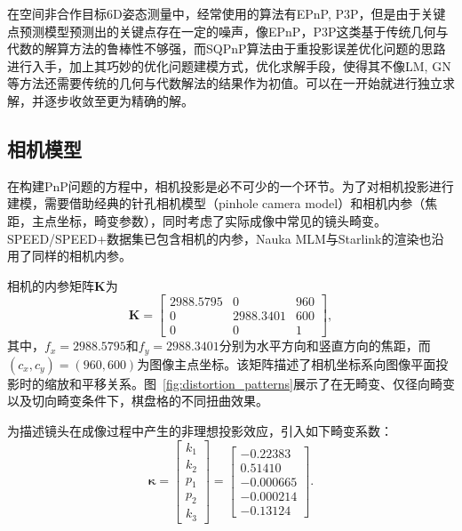 在空间非合作目标6D姿态测量中，经常使用的算法有EPnP, P3P，但是由于关键点预测模型预测出的关键点存在一定的噪声，像EPnP，P3P这类基于传统几何与代数的解算方法的鲁棒性不够强，而SQPnP算法\cite{terzakis2020consistently}由于重投影误差优化问题的思路进行入手，加上其巧妙的优化问题建模方式，优化求解手段，使得其不像LM, GN等方法还需要传统的几何与代数解法的结果作为初值。可以在一开始就进行独立求解，并逐步收敛至更为精确的解。
\subsection{相机模型}
在构建PnP问题的方程中，相机投影是必不可少的一个环节。为了对相机投影进行建模，需要借助经典的针孔相机模型（pinhole camera model）和相机内参（焦距，主点坐标，畸变参数），同时考虑了实际成像中常见的镜头畸变。SPEED/SPEED+数据集已包含相机的内参，Nauka MLM与Starlink的渲染也沿用了同样的相机内参。



相机的内参矩阵$\mathbf{K}$为
\begin{equation}
	\mathbf{K} =  
	\begin{bmatrix}
		2988.5795 & 0 & 960 \\
		0 & 2988.3401 & 600 \\
		0 & 0 & 1
	\end{bmatrix},
	\label{eq:cameraMatrix}
\end{equation}
其中，$f_x=2988.5795$和$f_y=2988.3401$分别为水平方向和竖直方向的焦距，而$(c_x, c_y)=(960,600)$为图像主点坐标。该矩阵描述了相机坐标系向图像平面投影时的缩放和平移关系。图~\ref{fig:distortion_patterns}展示了在无畸变、仅径向畸变以及切向畸变条件下，棋盘格的不同扭曲效果。


为描述镜头在成像过程中产生的非理想投影效应，引入如下畸变系数：
\begin{equation}
	\boldsymbol{\kappa} = 
	\begin{bmatrix}
		k_1 \\[2pt] k_2 \\[2pt] p_1 \\[2pt] p_2 \\[2pt] k_3
	\end{bmatrix}
	=
	\begin{bmatrix}
		-0.22383\\[2pt]
		0.51410\\[2pt]
		-0.000665\\[2pt]
		-0.000214\\[2pt]
		-0.13124
	\end{bmatrix}.
\end{equation}

